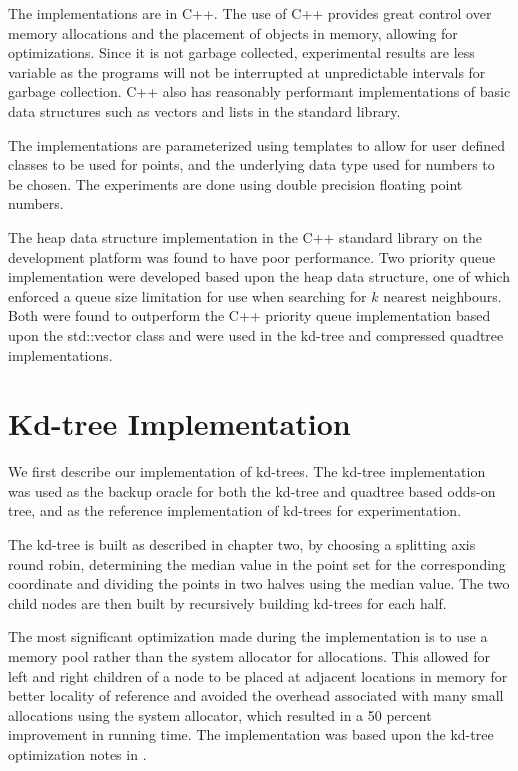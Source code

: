 \documentclass[mcs]{scsthesis}
\begin{document}
The implementations are in C++. The use of C++ provides great control over
memory allocations and the placement of objects in memory, allowing for
optimizations. Since it is not garbage collected, experimental results are less 
variable as the programs will not be interrupted at unpredictable intervals for
garbage collection. C++ also has reasonably performant implementations of basic
data structures such as vectors and lists in the standard library.

The implementations are parameterized using templates to allow for user defined
classes to be used for points, and the underlying data type used for numbers to
be chosen. The experiments are done using double precision floating point
numbers.

The heap data structure implementation in the C++ standard library on the
development platform was found to have poor performance. Two priority queue
implementation were developed based upon the heap data structure, one of which
enforced a queue size limitation for use when searching for \(k\) nearest
neighbours. Both were found to outperform the C++ priority queue implementation
based upon the std::vector class and were used in the kd-tree and compressed
quadtree implementations.

\section{Kd-tree Implementation}

We first describe our implementation of kd-trees. The kd-tree implementation was
used as the backup oracle for both the kd-tree and quadtree based odds-on tree,
and as the reference implementation of kd-trees for experimentation.

The kd-tree is built as described in chapter two, by choosing a splitting axis
round robin, determining the median value in the point set for the corresponding
coordinate and dividing the points in two halves using the median value. The two
child nodes are then built by recursively building kd-trees for each half.

The most significant optimization made during the implementation is to use
a memory pool rather than the system allocator for allocations. This allowed
for left and right children of a node to be placed at adjacent locations in
memory for better locality of reference and avoided the overhead associated
with many small allocations using the system allocator, which resulted in a
50 percent improvement in running time. The implementation was based upon the
kd-tree optimization notes in \cite{physicallybasedrendering}.
\end{document}
